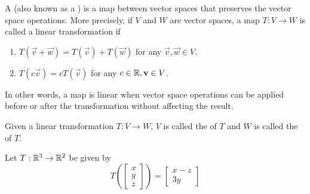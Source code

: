 \begin{applicationActivities}

\begin{definition}
A  (also known as a )
is a map between vector spaces that preserves the vector space operations.
More precisely, if \(V\) and $W$ are vector spaces, a map
\(T:V\rightarrow W\) is called a linear transformation if
\begin{enumerate}
\item \(T(\vec{v}+\vec{w}) = T(\vec{v})+T(\vec{w})\)
      for any \(\vec{v},\vec{w} \in V\).
\item \(T(c\vec{v}) = cT(\vec{v})\)
      for any \(c \in \mathbb{R},\mathbf{v} \in V\).
\end{enumerate}
In other words, a map is linear when vector space operations
can be applied before or after the transformation without affecting the result.
\end{definition}

\begin{definition}
Given a linear transformation \(T:V\to W\),
\(V\) is called the  of \(T\) and
\(W\) is called the  of \(T\).

\begin{center}
\end{center}
\end{definition}

\begin{example}
Let \(T : \mathbb{R}^3 \rightarrow \mathbb{R}^2\) be given by
\[
  T\left(\begin{bmatrix} x \\ y \\ z \end{bmatrix} \right)
=
  \begin{bmatrix} x-z \\ 3y \end{bmatrix}
\]


\end{example}
\end{applicationActivities}
